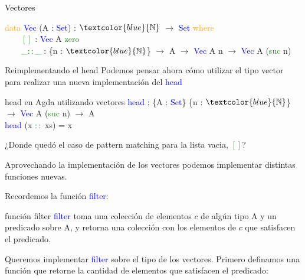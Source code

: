 \documentclass[xcolor=dvipsnames]{beamer} %
\newcommand{\cf}[1]{\textcolor{blue}{#1}}
\newcommand{\ct}[1]{\textcolor{blue}{#1}}
\newcommand{\cc}[1]{\textcolor{ForestGreen}{#1}}
\newcommand{\ck}[1]{\textcolor{orange}{#1}}
\newcommand{\N}{\ct{\mathbb{N}}}
\newcommand{\ra}{\rightarrow}
\newcommand{\T}{ \ \ \ \ }
\begin{document}
\begin{frame}

\begin{block}{Vectores}

\ck{data} \ct{Vec} (A : \ct{Set}) : $\N$ $\ra$ \ct{Set} \ck{where}\\
\T \cc{$[]$}     : \ct{Vec} A \cc{zero}\\
\T \cc{\_$::$\_} : \{n : $\N$\} $\ra$ A $\ra$ \ct{Vec} A n $\ra$ \ct{Vec} A (\cc{suc} n)

\end{block}

\begin{block}{Reimplementando el head}
Podemos pensar ahora cómo utilizar el tipo vector para realizar una
nueva implementación del \cf{head}
\end{block}

\pause

\begin{block}{head en Agda utilizando vectores}
    \cf{head} : \{A : \ct{Set}\} \{n : $\N$\} $\ra$ \ct{Vec} A (\cc{suc} n) $\ra$ A \\
    \pause
    \cf{head} (x \cc{$::$} xs) = x
\end{block}

\pause

\begin{block}{}
¿Donde quedó el caso de pattern matching para la lista vacia, \cc{$[]$}?
\end{block}

\end{frame}

\begin{frame}

  \begin{block}{}
  Aprovechando la implementación de los vectores podemos implementar distintas
  funciones nuevas.
  \end{block}

  \pause

  \begin{block}{}
  Recordemos la función \cf{filter}:
  \end{block}

  \begin{exampleblock}{función filter}
    \cf{filter} toma una colección de elementos $c$ de algún tipo A y un predicado sobre A, y retorna
    una colección con los elementos de $c$ que satisfacen el predicado.
  \end{exampleblock}

  \pause
  
  \begin{block}{}
    Queremos implementar \cf{filter} sobre el tipo de los vectores. Primero definamos una función
    que retorne la cantidad de elementos que satisfacen el predicado:
  \end{block}
  
\end{frame}
\end{document}
